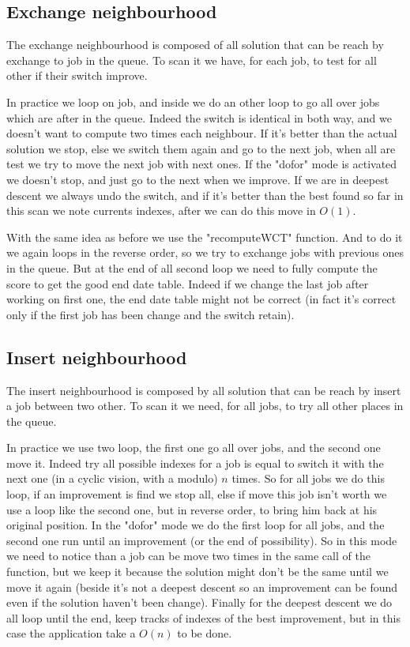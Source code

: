 \documentclass[12pt,a4paper]{article}
\begin{document}
\subsection{Exchange neighbourhood}

The exchange neighbourhood is composed of all solution that can be reach by exchange to job in the queue. To scan it we have, for each job, to test for all other if their switch improve.

In practice we loop on job, and inside we do an other loop to go all over jobs which are after in the queue. Indeed the switch is identical in both way, and we doesn't want to compute two times each neighbour. If it's better than the actual solution we stop, else we switch them again and go to the next job, when all are test we try to move the next job with next ones. If the "dofor" mode is activated we doesn't stop, and just go to the next when we improve. If we are in deepest descent we always undo the switch, and if it's better than the best found so far in this scan we note currents indexes, after we can do this move in $O(1)$.

With the same idea as before we use the "recomputeWCT" function. And to do it we again loops in the reverse order, so we try to exchange jobs with previous ones in the queue. But at the end of all second loop we need to fully compute the score to get the good end date table. Indeed if we change the last job after working on first one, the end date table might not be correct (in fact it's correct only if the first job has been change and the switch retain).

\subsection{Insert neighbourhood}

The insert neighbourhood is composed by all solution that can be reach by insert a job between two other. To scan it we need, for all jobs, to try all other places in the queue.

In practice we use two loop, the first one go all over jobs, and the second one move it. Indeed try all possible indexes for a job is equal to switch it with the next one (in a cyclic vision, with a modulo) $n$ times. So for all jobs we do this loop, if an improvement is find we stop all, else if move this job isn't worth we use a loop like the second one, but in reverse order, to bring him back at his original position. In the "dofor" mode we do the first loop for all jobs, and the second one run until an improvement (or the end of possibility). So in this mode we need to notice than a job can be move two times in the same call of the function, but we keep it because the solution might don't be the same until we move it again (beside it's not a deepest descent so an improvement can be found even if the solution haven't been change). Finally for the deepest descent we do all loop until the end, keep tracks of indexes of the best improvement, but in this case the application take a $O(n)$ to be done.
\end{document}
